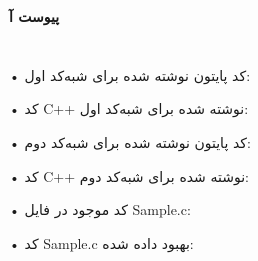 \documentclass[12pt]{exam}
\begin{document}
\newpage
\fontsize{30}{30} \textbf{پیوست آ\label{پیوست آ}} \\ \\ \\

• کد پایتون نوشته شده برای شبه‌کد اول:
\begin{latin}
	
\end{latin}





• کد C++ نوشته شده برای شبه‌کد اول:
\begin{latin}
	
\end{latin}







• کد پایتون نوشته شده برای شبه‌کد دوم:
\begin{latin}
	
\end{latin}






• کد C++ نوشته شده برای شبه‌کد دوم:
\begin{latin}
	
\end{latin}


• کد موجود در فایل Sample.c: 
\begin{latin}
	
\end{latin}




• کد Sample.c بهبود داده شده:
\begin{latin}
	
\end{latin}
\end{document}
